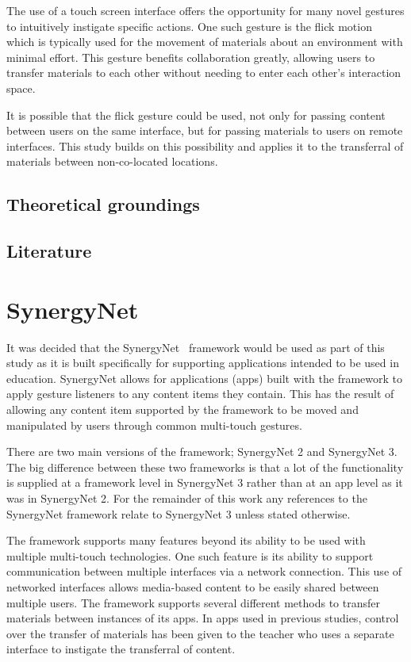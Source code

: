 \documentclass[a4paper,11pt]{article}
\begin{document}
The use of a touch screen interface offers the opportunity for many novel gestures to intuitively instigate specific actions. %
One such gesture is the flick motion~\cite{reetz-et-al:2006} which is typically used for the movement of materials about an environment with minimal effort.
This gesture benefits collaboration greatly, allowing users to transfer materials to each other without needing to enter each other's interaction space.
 
It is possible that the flick gesture could be used, not only for passing content between users on the same interface, but for passing materials to users on remote interfaces.
This study builds on this possibility and applies it to the transferral of materials between non-co-located locations.

\subsection{Theoretical groundings}


\subsection{Literature}



\section{SynergyNet}

It was decided that the SynergyNet~\cite{alagha-et-al:2010,higgins-et-al:2011} framework would be used as part of this study as it is built specifically for supporting applications intended to be used in education.
SynergyNet allows for applications (apps) built with the framework to apply gesture listeners to any content items they contain.
This has the result of allowing any content item supported by the framework to be moved and manipulated by users through common multi-touch gestures.

There are two main versions of the framework; SynergyNet 2 and SynergyNet 3.
The big difference between these two frameworks is that a lot of the functionality is supplied at a framework level in SynergyNet 3 rather than at an app level as it was in SynergyNet 2.
For the remainder of this work any references to the SynergyNet framework relate to SynergyNet 3 unless stated otherwise.

The framework supports many features beyond its ability to be used with multiple multi-touch technologies.
One such feature is its ability to support communication between multiple interfaces via a network connection.
This use of networked interfaces allows media-based content to be easily shared between multiple users.
The framework supports several different methods to transfer materials between instances of its apps.
In apps used in previous studies, control over the transfer of materials has been given to the teacher who uses a separate interface to instigate the transferral of content. %
\end{document}
